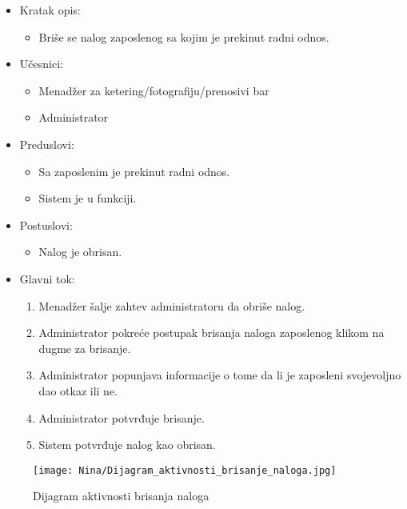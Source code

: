 \documentclass[a4paper]{article}
\begin{document}
\begin{itemize}
    \item Kratak opis: 
    \begin{itemize}
        \item Briše se nalog zaposlenog sa kojim je prekinut radni odnos.
    \end{itemize}
    \item Učesnici:
        \begin{itemize}
        \item Menadžer za ketering/fotografiju/prenosivi bar
        \item Administrator
    \end{itemize}
    \item Preduslovi:
        \begin{itemize}
            \item Sa zaposlenim je prekinut radni odnos.
            \item Sistem je u funkciji.
        \end{itemize}
    \item Postuslovi:
        \begin{itemize}
            \item Nalog je obrisan.
        \end{itemize}
    \item Glavni tok:
        \begin{enumerate}
            \item Menadžer šalje zahtev administratoru da obriše nalog.
            \item Administrator pokreće postupak brisanja naloga zaposlenog klikom na dugme za brisanje.
            \item Administrator popunjava informacije o tome da li je zaposleni svojevoljno dao otkaz ili ne.
            \item Administrator potvrđuje brisanje.
            \item Sistem potvrđuje nalog kao obrisan.
        \end{enumerate}
\end{itemize}

\begin{figure}[H]
    \centering
    \texttt{[image: Nina/Dijagram\_aktivnosti\_brisanje\_naloga.jpg]}
    \caption{Dijagram aktivnosti brisanja naloga}
    \label{fig:RegistracijaZ}
\end{figure}


\end{document}
